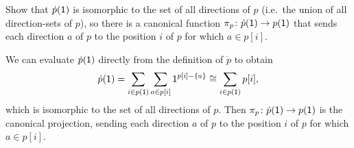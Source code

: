 \documentclass[Book-Poly]{subfiles}
\begin{document}
\begin{exercise} \label{exc.deriv_directions}
Show that $\dot{p}(\textsf{1})$ is isomorphic to the set of all directions of $p$ (i.e.\ the union of all direction-sets of $p$), so there is a canonical function $\pi_p \colon \dot{p}(\textsf{1}) \to p(\textsf{1})$ that sends each direction $a$ of $p$ to the position $i$ of $p$ for which $a \in p[i]$.
\begin{solution}
We can evaluate $\dot{p}(\textsf{1})$ directly from the definition of $\dot{p}$ to obtain
\[
    \dot{p}(\textsf{1}) = \sum_{i \in p(\textsf{1})} \sum_{a \in p[i]} \textsf{1}^{p[i]-\{a\}} \cong \sum_{i \in p(\textsf{1})} p[i],
\]
which is isomorphic to the set of all directions of $p$.
Then $\pi_p \colon \dot{p}(\textsf{1}) \to p(\textsf{1})$ is the canonical projection, sending each direction $a$ of $p$ to the position $i$ of $p$ for which $a \in p[i]$.
\end{solution}
\end{exercise}
\end{document}
